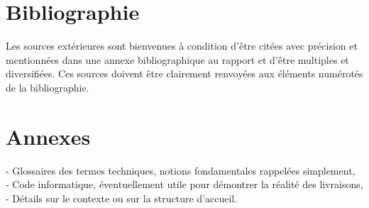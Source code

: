 \documentclass[11pt]{article}
\begin{document}
  \pagebreak
  \section{Bibliographie}
  Les sources extérieures sont bienvenues à condition d’être citées avec précision et mentionnées dans
  une annexe bibliographique au rapport et d’être multiples et diversifiées.
  Ces sources doivent être clairement renvoyées aux éléments numérotés de la bibliographie.

  \pagebreak
  \section{Annexes}
  - Glossaires des termes techniques, notions fondamentales rappelées simplement, \\
  - Code informatique, éventuellement utile pour démontrer la réalité des livraisons, \\
  - Détails sur le contexte ou sur la structure d’accueil. 
\end{document}
